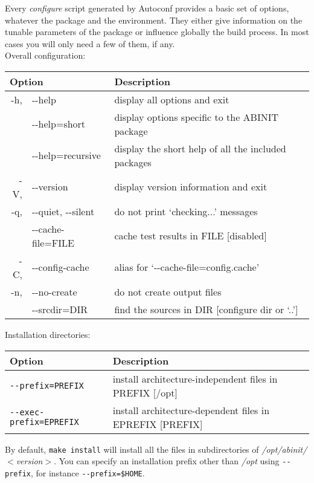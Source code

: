 Every \textit{configure} script generated by Autoconf provides a basic
set of options, whatever the package and the environment. They either
give information on the tunable parameters of the package or influence
globally the build process. In most cases you will only need a few
of them, if any. \\


Overall configuration:

\begin{center}
\begin{tabular}{|rl|l|}
\hline 
\multicolumn{2}{|l|}{\textbf{Option}} & \textbf{Description} \tabularnewline
\hline 
-h,  & -{-}help  & display all options and exit \tabularnewline
 & -{-}help=short  & display options specific to the ABINIT package \tabularnewline
 & -{-}help=recursive  & display the short help of all the included packages \tabularnewline
-V,  & -{-}version  & display version information and exit \tabularnewline
-q,  & -{-}quiet, -{-}silent  & do not print `checking...' messages \tabularnewline
 & -{-}cache-file=FILE  & cache test results in FILE {[}disabled{]} \tabularnewline
-C,  & -{-}config-cache  & alias for `-{-}cache-file=config.cache' \tabularnewline
-n,  & -{-}no-create  & do not create output files \tabularnewline
 & -{-}srcdir=DIR  & find the sources in DIR {[}configure dir or `..'{]} \tabularnewline
\hline
\end{tabular}
\par\end{center}

Installation directories:

\begin{center}
\begin{tabular}{|l|p{9cm}|}
\hline 
\textbf{Option}  & \textbf{Description} \tabularnewline
\hline 
\texttt{-{-}prefix=PREFIX}  & install architecture-independent files in PREFIX {[}/opt{]} \tabularnewline
\texttt{-{-}exec-prefix=EPREFIX}  & install architecture-dependent files in EPREFIX {[}PREFIX{]} \tabularnewline
\hline
\end{tabular}
\par\end{center}

By default, \texttt{make install} will install all the files in subdirectories
of \textit{/opt/abinit/$<$version$>$}. You can specify an installation
prefix other than \textit{/opt} using \texttt{\hbox{-{-}prefix}},
for instance \texttt{\hbox{-{-}prefix=\$HOME}}. \\


